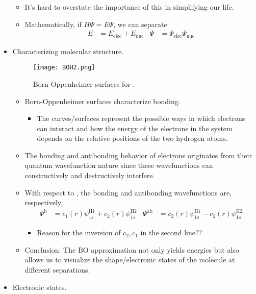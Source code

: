 \documentclass[../notes.tex]{subfiles}
\begin{document}
\begin{itemize}
\begin{itemize}
        \item It's hard to overstate the importance of this in simplifying our life.
        \item Mathematically, if $H\Psi=E\Psi$, we can separate
        \begin{align*}
            E &= E_\text{elec}+E_\text{nuc}&
            \Psi &= \Psi_\text{elec}\Psi_\text{nuc}
        \end{align*}
    \end{itemize}
    \item Characterizing molecular structure.
    \begin{figure}[h!]
        \centering
        \texttt{[image: BOH2.png]}
        \caption{Born-Oppenheimer surfaces for .}
        \label{fig:BOH2}
    \end{figure}
    \begin{itemize}
        \item Born-Oppenheimer surfaces characterize bonding.
        \begin{itemize}
            \item The curves/surfaces represent the possible ways in which electrons can interact and how the energy of the electrons in the system depends on the relative positions of the two hydrogen atoms.
        \end{itemize}
        \item The bonding and antibonding behavior of electrons originates from their quantum wavefunction nature since these wavefunctions can constructively and destructively interfere.
        \item With respect to , the bonding and antibonding wavefunctions are, respectively,
        \begin{align*}
            \Psi^\text{b} &= c_1(r)\psi_{1s}^\text{H1}+c_2(r)\psi_{1s}^\text{H2}&
            \Psi^\text{ab} &= c_2(r)\psi_{1s}^\text{H1}-c_2(r)\psi_{1s}^\text{H2}
        \end{align*}
        \begin{itemize}
            \item Reason for the inversion of $c_2,c_1$ in the second line??
        \end{itemize}
        \item Conclusion: The BO approximation not only yields energies but also allows us to visualize the shape/electronic states of the molecule at different separations.
    \end{itemize}
    \item Electronic states.

\end{itemize}
\end{document}
